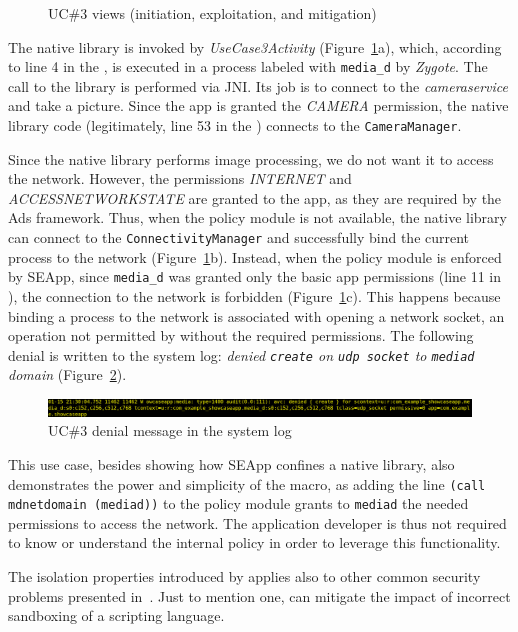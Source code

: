 \begin{figure}[h]
  \caption{\label{fig:seapp_uc3_views} UC\#3 views (initiation, exploitation, and mitigation)}
\end{figure}

The native library is invoked by {\em UseCase3Activity}
(Figure~\ref{fig:seapp_uc3_views}a), which, according to line 4 in the
\seappcontexts, is executed in a process labeled with {\tt media\_d}
by {\em Zygote}.  The call to the library is performed via JNI. Its
job is to connect to the {\em camera\textunderscore service} and take
a picture.  Since the app is granted the {\em CAMERA} permission, the
native library code (legitimately, line 53 in the \sepolicy) connects
to the {\tt CameraManager}.

Since the native library performs image processing, we do not want it
to access the network. However, the permissions {\em INTERNET} and
{\em ACCESS\textunderscore NETWORK\textunderscore STATE} are granted
to the app, as they are required by the Ads framework.  Thus, when the
policy module is not available, the native library can connect to the
{\tt ConnectivityManager} and successfully bind the current process to
the network (Figure~\ref{fig:seapp_uc3_views}b).  Instead, when the
policy module is enforced by SEApp, since {\tt media\_d} was granted
only the basic app permissions (line 11 in \sepolicy), the connection
to the network is forbidden (Figure~\ref{fig:seapp_uc3_views}c).  This
happens because binding a process to the network is associated with
opening a network socket, an operation not permitted by \sel without
the required permissions. The following denial is written to the
system log: {\em denied {\tt create} on {\tt udp\textunderscore
    socket} to {\tt media\textunderscore d} domain}
(Figure~\ref{fig:seapp_uc3_logcat}).

\begin{figure}[h]
  \centering
  \includegraphics[width=\textwidth]{chapters/seapp/figs/ae/uc35.png}
  \caption{\label{fig:seapp_uc3_logcat}  UC\#3 \sel denial message in the system log}
\end{figure}      

This use case, besides showing how SEApp confines a native library,
also demonstrates the power and simplicity of the macro, as adding the
line {\tt (call md\textunderscore netdomain (media\textunderscore d))}
to the policy module grants to {\tt media\textunderscore d} the needed
permissions to access the network.  The application developer is thus
not required to know or understand the internal \sel policy in order
to leverage this functionality.

The isolation properties introduced by \seapp applies also to other
common security problems presented
in~\cite{seapp_common_play_protect_vulnerabilites}. Just to mention
one, \seapp can mitigate the impact of incorrect sandboxing of a
scripting language.

